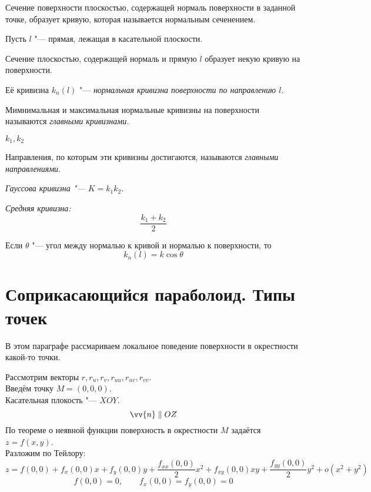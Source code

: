 \begin{definition}
	Сечение поверхности плоскостью, содержащей нормаль поверхности в заданной точке, образует кривую, которая называется нормальным сеченением.
\end{definition}

\begin{definition}
	Пусть $ l $ "--- прямая, лежащая в касательной плоскости.

	Сечение плоскостью, содержащей нормаль и прямую $ l $ образует некую кривую на поверхности.

	Её кривизна $ k_n(l) $ "--- \it{нормальная кривизна} поверхности по направлению $ l $.
\end{definition}

\begin{definition}
	Мимнимальная и максимальная нормальные кривизны на поверхности называются \it{главными кривизнами}.
\end{definition}

\begin{notation}
	$ k_1, k_2 $
\end{notation}

\begin{definition}
	Направления, по которым эти кривизны достигаются, называются \it{главными направлениями}.
\end{definition}

\begin{definition}
	\it{Гауссова кривизна} "--- $ K = k_1k_2 $.
\end{definition}

\begin{definition}
	\it{Средняя кривизна}:
	$$ \frac{k_1 + k_2}2 $$
\end{definition}

\begin{theorem}[Мёнье]
	Если $ \theta $ "--- угол между нормалью к кривой и нормалью к поверхности, то
	$$ k_n(l) = k\cos \theta $$
\end{theorem}

\TODO{}

\section{Соприкасающийся параболоид. Типы точек}

В этом параграфе рассмариваем локальное поведение поверхности в окрестности какой-то точки.

Рассмотрим векторы $ r, r_u, r_v, r_{uu}, r_{uv}, r_{vv} $. \\
Введём точку $ M = (0, 0, 0) $. \\
Касательная плокость "--- $ XOY $.
$$ \vv{n} \parallel OZ $$
По теореме о неявной функции поверхность в окрестности $ M $ задаётся $ z = f(x, y) $. \\
Разложим по Тейлору:
$$ z = f(0, 0) + f_x(0, 0)x + f_y(0, 0)y + \frac{f_{xx}(0, 0)}2x^2 + f_{xy}(0, 0)xy + \frac{f_{yy}(0, 0)}2y^2 + o(x^2 + y^2) $$
$$ f(0, 0) = 0, \qquad f_x(0, 0) = f_y(0, 0) = 0 $$

